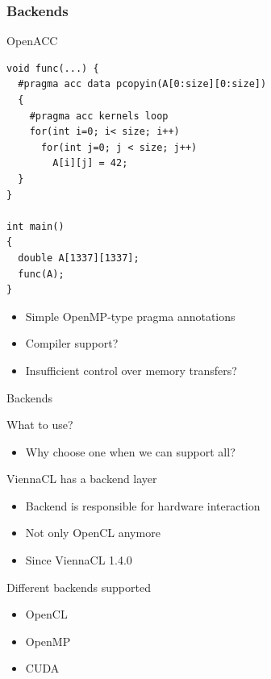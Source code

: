\begin{frame}[fragile]
\frametitle{Backends}
 \begin{block}{OpenACC}
  { \lstset{ basicstyle=\scriptsize\ttfamily } \begin{lstlisting}
void func(...) {
  #pragma acc data pcopyin(A[0:size][0:size])
  {
    #pragma acc kernels loop
    for(int i=0; i< size; i++)
      for(int j=0; j < size; j++)
        A[i][j] = 42;
  }
}

int main()
{
  double A[1337][1337];
  func(A);
}
  \end{lstlisting} }

  \begin{itemize}
   \item Simple OpenMP-type pragma annotations
   \item Compiler support?
   \item Insufficient control over memory transfers?
  \end{itemize}
 \end{block}

\end{frame}



\begin{frame}{Backends}

\begin{block}{What to use?}
  \begin{itemize}
    \item Why choose one when we can support all?
  \end{itemize}
\end{block}

\begin{block}{ViennaCL has a backend layer}
  \begin{itemize}
    \item Backend is responsible for hardware interaction
    \item Not only OpenCL anymore
    \item Since ViennaCL 1.4.0
  \end{itemize}
\end{block}

\begin{block}{Different backends supported}
  \begin{itemize}
    \item OpenCL
    \item OpenMP
    \item CUDA
  \end{itemize}
\end{block}

\end{frame}



